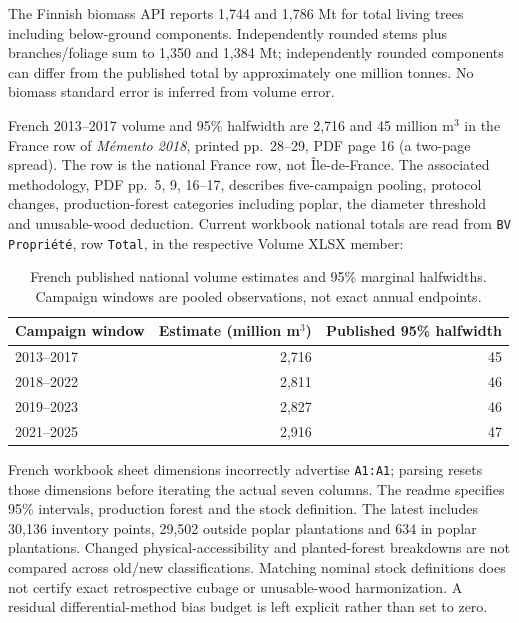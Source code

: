 The Finnish biomass API reports 1,744 and 1,786 Mt for total living trees including below-ground components. Independently rounded stems plus branches/foliage sum to 1,350 and 1,384 Mt; independently rounded components can differ from the published total by approximately one million tonnes. No biomass standard error is inferred from volume error. 

French 2013--2017 volume and 95\% halfwidth are 2,716 and 45 million m$^3$ in the France row of \emph{M\'emento 2018}, printed pp.~28--29, PDF page 16 (a two-page spread). The row is the national France row, not \^Ile-de-France. The associated methodology, PDF pp.~5, 9, 16--17, describes five-campaign pooling, protocol changes, production-forest categories including poplar, the diameter threshold and unusable-wood deduction. Current workbook national totals are read from \texttt{BV Propri\'et\'e}, row \texttt{Total}, in the respective Volume XLSX member:
\begin{table}[htbp]\centering\small
\caption{French published national volume estimates and 95\% marginal halfwidths. Campaign windows are pooled observations, not exact annual endpoints.}\label{tab:SI_France_windows}
\begin{tabular}{lrr}\toprule
Campaign window & Estimate (million m$^3$) & Published 95\% halfwidth\\\midrule
2013--2017 & 2,716 & 45\\
2018--2022 & 2,811 & 46\\
2019--2023 & 2,827 & 46\\
2021--2025 & 2,916 & 47\\\bottomrule
\end{tabular}\end{table}

French workbook sheet dimensions incorrectly advertise \texttt{A1:A1}; parsing resets those dimensions before iterating the actual seven columns. The readme specifies 95\% intervals, production forest and the stock definition. The latest includes 30,136 inventory points, 29,502 outside poplar plantations and 634 in poplar plantations. Changed physical-accessibility and planted-forest breakdowns are not compared across old/new classifications. Matching nominal stock definitions does not certify exact retrospective cubage or unusable-wood harmonization. A residual differential-method bias budget is left explicit rather than set to zero.

